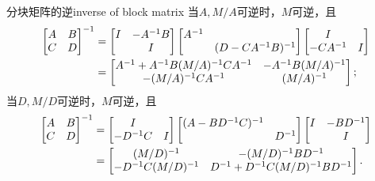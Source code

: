 \begin{theorem}
	{分块矩阵的逆}{inverse of block matrix}
	当$A,M/A$可逆时，$M$可逆，且
	\begin{subequations}
		\begin{align}
			\begin{bmatrix}
				A&B\\C&D
			\end{bmatrix}^{-1}&=\begin{bmatrix}
				I&-A^{-1} B\\ &I
			\end{bmatrix}\begin{bmatrix}
				A^{-1}\\ &(D-CA^{-1} B)^{-1}
			\end{bmatrix}\begin{bmatrix}
				I\\-CA^{-1}&I
			\end{bmatrix}\\
			\label{eqn:[AB;CD]-1=M/A}
			&=\begin{bmatrix}
				A^{-1}+A^{-1} B(M/A)^{-1} CA^{-1}&-A^{-1} B(M/A)^{-1}\\
				-(M/A)^{-1} CA^{-1}&(M/A)^{-1}
			\end{bmatrix};
		\end{align}
	\end{subequations}
	当$D,M/D$可逆时，$M$可逆，且
	\begin{subequations}
		\begin{align}
			\begin{bmatrix}
				A&B\\C&D
			\end{bmatrix}^{-1}&=\begin{bmatrix}
				I\\-D^{-1} C&I
			\end{bmatrix}\begin{bmatrix}
				(A-BD^{-1} C)^{-1}\\ &D^{-1}
			\end{bmatrix}\begin{bmatrix}
				I&-BD^{-1}\\ &I
			\end{bmatrix}\\
			\label{eqn:[AB;CD]-1=M/D}
			&=\begin{bmatrix}
				(M/D)^{-1}&-(M/D)^{-1} BD^{-1}\\
				-D^{-1} C(M/D)^{-1}&D^{-1}+D^{-1} C(M/D)^{-1} BD^{-1}
			\end{bmatrix}.
		\end{align}
	\end{subequations}

\end{theorem}
